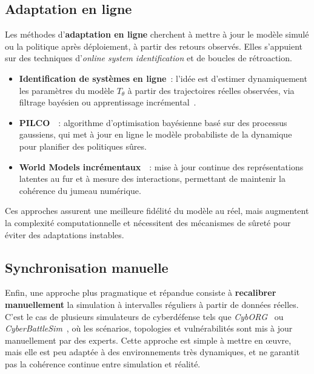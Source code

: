 \subsection{Adaptation en ligne}

\noindent
Les méthodes d’\textbf{adaptation en ligne} cherchent à
mettre à jour le modèle simulé ou la politique après déploiement,
à partir des retours observés.
Elles s’appuient sur des techniques d’\textit{online system identification}
et de boucles de rétroaction.

\begin{itemize}
    \item \textbf{Identification de systèmes en ligne}~: l’idée est d’estimer
          dynamiquement les paramètres du modèle $T_\theta$
          à partir des trajectoires réelles observées,
          via filtrage bayésien ou apprentissage incrémental~\cite{ljung1999system}.
    \item \textbf{PILCO}~\cite{deisenroth2011pilco}~: algorithme d’optimisation
          bayésienne basé sur des processus gaussiens,
          qui met à jour en ligne le modèle probabiliste de la dynamique
          pour planifier des politiques sûres.
    \item \textbf{World Models incrémentaux}~\cite{hafner2019learning}~:
          mise à jour continue des représentations latentes
          au fur et à mesure des interactions,
          permettant de maintenir la cohérence du jumeau numérique.
\end{itemize}

\noindent
Ces approches assurent une meilleure fidélité du modèle au réel,
mais augmentent la complexité computationnelle et nécessitent
des mécanismes de sûreté pour éviter des adaptations instables.

\subsection{Synchronisation manuelle}

\noindent
Enfin, une approche plus pragmatique et répandue consiste à
\textbf{recalibrer manuellement} la simulation
à intervalles réguliers à partir de données réelles.
C’est le cas de plusieurs simulateurs de cyberdéfense tels que
\textit{CybORG}~\cite{Standen2021} ou
\textit{CyberBattleSim}~\cite{cyberbattlesim},
où les scénarios, topologies et vulnérabilités sont mis à jour
manuellement par des experts.
Cette approche est simple à mettre en œuvre,
mais elle est peu adaptée à des environnements très dynamiques,
et ne garantit pas la cohérence continue entre simulation et réalité.

